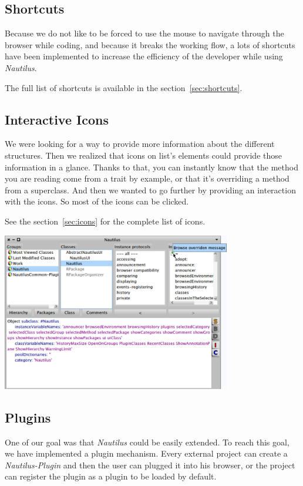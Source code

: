 \documentclass[a4paper,10pt,twoside]{book}
\newcommand\nautilus{\emph{Nautilus}\xspace}
\begin{document}
\subsection*{Shortcuts}

Because we do not like to be forced to use the mouse to navigate through the browser while coding, and because it breaks the working flow, a lots of shortcuts have been implemented to increase the efficiency of the developer while using \nautilus.

The full list of shortcuts is available in the section~\ref{sec:shortcuts}. 

\subsection*{Interactive Icons}

We were looking for a way to provide more information about the different structures. Then we realized that icons on list's elements could provide those information in a glance. Thanks to that, you can instantly know that the method you are reading come from a trait by example, or that it's overriding a method from a superclass. And then we wanted to go further by providing an interaction with the icons. So most of the icons can be clicked. 

See the section~\ref{sec:icons} for the complete list of icons.
\begin{center}
	\includegraphics[width=10cm]{figures/icons1}
	\label{fig:icons1}
\end{center}


\subsection*{Plugins}

One of our goal was that \nautilus could be easily extended. To reach this goal, we have implemented a plugin mechanism. Every external project can create a \emph{Nautilus-Plugin} and then the user can plugged it into his browser, or the project can register the plugin as a plugin to be loaded by default. 
\end{document}
